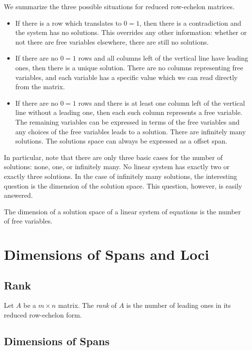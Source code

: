 \documentclass[fleqn]{report}
\begin{document}
We summarize the three possible situations for reduced
row-echelon matrices.
\begin{itemize}
\item If there is a row which translates to $0=1$, then there is
a contradiction and the system has no solutions. This overrides
any other information: whether or not there are free variables
elsewhere, there are still no solutions.
\item If there are no $0=1$ rows and all columns left of the
vertical line have leading ones, then there is a unique
solution. There are no columns representing free variables,
and each variable has a specific value which we can read
directly from the matrix. 
\item If there are no $0=1$ rows and there is at least one
column left of the vertical line without a leading one, then
each such column represents a free variable. The remaining
variables can be expressed in terms of the free variables and
any choices of the free variables leads to a solution. There
are infinitely many solutions. The solutions space can always
be expressed as a offset span.
\end{itemize}
In particular, note that there are only three basic cases for
the number of solutions: none, one, or infinitely many. No linear
system has exactly two or exactly three solutions. In the case
of infinitely many solutions, the interesting question is the
dimension of the solution space. This question, however, is
easily answered.

\begin{prop}
The dimension of a solution space of a linear system of
equations is the number of free variables.
\end{prop}

\chapter{Dimensions of Spans and Loci}

\section{Rank} 

\begin{defn}
Let $A$ be a $m \times n$ matrix. The \emph{rank} of $A$ is the
number of leading ones in its reduced row-echelon form.
\end{defn}

\section{Dimensions of Spans}
\end{document}
